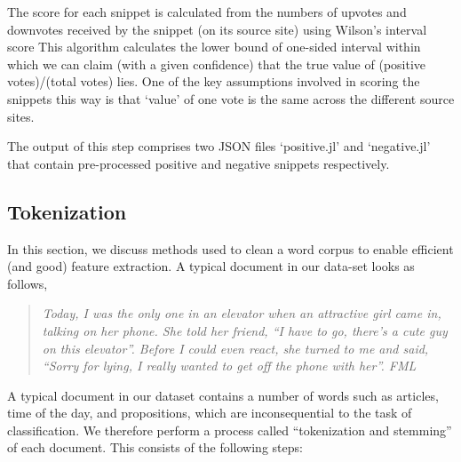 \documentclass[11pt, letterpaper, conference, final, twocolumn]{ieeeconf}
\begin{document}
The score for each snippet is calculated from the numbers of upvotes and
downvotes received by the snippet (on its source site) using Wilson's interval score
This algorithm calculates the lower bound of one-sided interval within which we
can claim (with a given confidence) that the true value of (positive
votes)/(total votes) lies. One of the key assumptions involved in scoring the snippets this way is that `value' of one vote is the same across the different source sites. 

The output of this step comprises two JSON files `positive.jl' and `negative.jl' that contain pre-processed positive and negative snippets respectively.

\subsection{Tokenization}
\label{ssec:tokenization}

In this section, we discuss methods used to clean a word corpus to enable efficient (and good) feature extraction. A typical document in our data-set looks as follows,
\begin{quote}
\small \emph{Today, I was the only one in an elevator when an attractive girl came in, talking on her phone.  She told her friend, ``I have to go, there's a cute guy on this elevator''.  Before I could even react, she turned to me and said, ``Sorry for lying, I really wanted to get off the phone with her''. FML}
\end{quote}
A typical document in our dataset contains a number of words such as articles, time of the day, and propositions, which are inconsequential to the task of classification. We therefore perform a process called ``tokenization and stemming'' of each document. This consists of the following steps:
\end{document}
